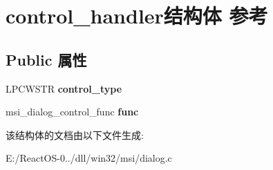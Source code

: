 \hypertarget{structcontrol__handler}{}\section{control\+\_\+handler结构体 参考}
\label{structcontrol__handler}
\subsection*{Public 属性}
\begin{DoxyCompactItemize}
\item 
\mbox{\label{structcontrol__handler_a00a624779a66a68a4bfb1a88779965df}} 
L\+P\+C\+W\+S\+TR {\bfseries control\+\_\+type}
\item 
\mbox{\label{structcontrol__handler_acc461d1982e5da45daea26b56b0f6c5d}} 
msi\+\_\+dialog\+\_\+control\+\_\+func {\bfseries func}
\end{DoxyCompactItemize}


该结构体的文档由以下文件生成\+:\begin{DoxyCompactItemize}
\item 
E\+:/\+React\+O\+S-\/0../dll/win32/msi/dialog.\+c\end{DoxyCompactItemize}
